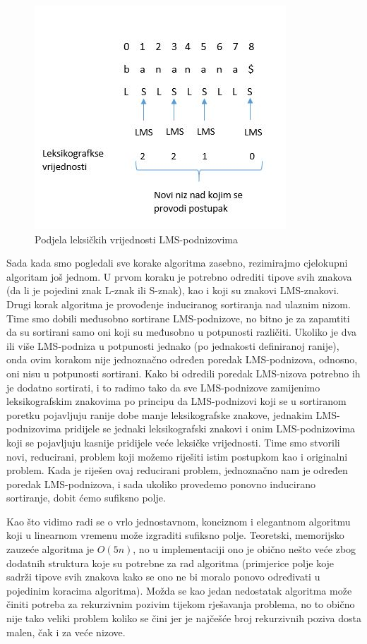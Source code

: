 \begin{figure}[H]
   \centering
       \includegraphics{./pictures/leksvrij.jpg}
 \caption{Podjela leksičkih vrijednosti LMS-podnizovima}
 \label{fig:leks}
\end{figure}


Sada kada smo pogledali sve korake algoritma zasebno, rezimirajmo cjelokupni algoritam još jednom. U prvom koraku je potrebno odrediti tipove svih znakova (da li je pojedini znak L-znak ili S-znak), kao i koji su znakovi LMS-znakovi. Drugi korak algoritma je provođenje induciranog sortiranja nad ulaznim nizom. Time smo dobili međusobno sortirane LMS-podnizove, no bitno je za zapamtiti da su sortirani samo oni koji su međusobno u potpunosti različiti. Ukoliko je dva ili više LMS-podniza u potpunosti jednako (po jednakosti definiranoj ranije), onda ovim korakom nije jednoznačno određen poredak LMS-podnizova, odnosno, oni nisu u potpunosti sortirani. Kako bi odredili poredak LMS-nizova potrebno ih je dodatno sortirati, i to radimo tako da sve LMS-podnizove zamijenimo leksikografskim znakovima po principu da LMS-podnizovi koji se u sortiranom poretku pojavljuju ranije dobe manje leksikografske znakove, jednakim LMS-podnizovima pridijele se jednaki leksikografski znakovi i onim LMS-podnizovima koji se pojavljuju kasnije pridijele veće leksičke vrijednosti. Time smo stvorili novi, reducirani, problem koji možemo riješiti istim postupkom kao i originalni problem. Kada je riješen ovaj reducirani problem, jednoznačno nam je određen poredak LMS-podnizova, i sada ukoliko provedemo ponovno inducirano sortiranje, dobit ćemo sufiksno polje.


Kao što vidimo radi se o vrlo jednostavnom, konciznom i elegantnom algoritmu koji u linearnom vremenu može izgraditi sufiksno polje. Teoretski, memorijsko zauzeće algoritma je $O(5n)$, no u implementaciji ono je obično nešto veće zbog dodatnih struktura koje su potrebne za rad algoritma (primjerice polje koje sadrži tipove svih znakova kako se ono ne bi moralo ponovo određivati u pojedinim koracima algoritma). Možda se kao jedan nedostatak algoritma može činiti potreba za rekurzivnim pozivim tijekom rješavanja problema, no to obično nije tako veliki problem koliko se čini jer je najčešće broj rekurzivnih poziva dosta malen, čak i za veće nizove.


